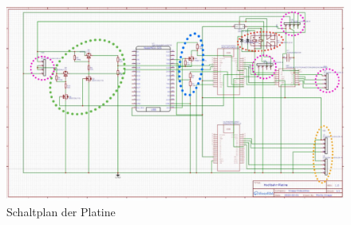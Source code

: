 \begin{figure}[h]
	\begin{center}
		\includegraphics[width=13.3cm]{schaltplan.jpg}
		\caption{\label{pic:schaltplan} Schaltplan der Platine}
	\end{center}
\end{figure}



